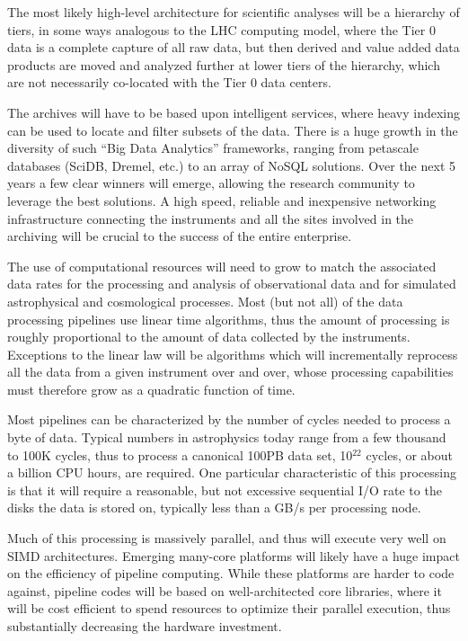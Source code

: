 The most likely high-level architecture for scientific analyses will
be a hierarchy of tiers, in some ways analogous to the LHC computing
model, where the Tier 0 data is a complete capture of all raw data,
but then derived and value added data products are moved and analyzed
further at lower tiers of the hierarchy, which are not necessarily
co-located with the Tier 0 data centers.

The archives will have to be based upon intelligent services, where
heavy indexing can be used to locate and filter subsets of the
data. There is a huge growth in the diversity of such ``Big Data
Analytics'' frameworks, ranging from petascale databases (SciDB,
Dremel, etc.) to an array of NoSQL solutions. Over the next 5 years a
few clear winners will emerge, allowing the research community to
leverage the best solutions. A high speed, reliable and
inexpensive networking infrastructure connecting the instruments and
all the sites involved in the archiving will be crucial to the success
of the entire enterprise.

\medskip


The use of computational resources will need to grow to match the
associated data rates for the processing and analysis of observational
data and for simulated astrophysical and cosmological processes. Most
(but not all) of the data processing pipelines use linear time
algorithms, thus the amount of processing is roughly proportional to
the amount of data collected by the instruments. Exceptions to the
linear law will be algorithms which will incrementally reprocess all
the data from a given instrument over and over, whose processing
capabilities must therefore grow as a quadratic function of time.

Most pipelines can be characterized by the number of cycles needed to
process a byte of data. Typical numbers in astrophysics today range
from a few thousand to 100K cycles, thus to process a canonical 100PB
data set, 10$^{22}$ cycles, or about a billion CPU hours, are
required. One particular characteristic of this processing is that it
will require a reasonable, but not excessive sequential I/O rate to
the disks the data is stored on, typically less than a GB/s per
processing node.

Much of this processing is massively parallel, and thus will execute
very well on SIMD architectures. Emerging many-core platforms will
likely have a huge impact on the efficiency of pipeline
computing. While these platforms are harder to code against, pipeline
codes will be based on well-architected core libraries, where it will
be cost efficient to spend resources to optimize their parallel
execution, thus substantially decreasing the hardware investment.

